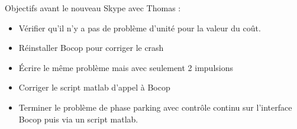 \documentclass[fleqn,%
a4paper,11pt]{scrbook}
\begin{document}
Objectifs avant le nouveau Skype avec Thomas :
	\begin{itemize}
		\item Vérifier qu'il n'y a pas de problème d'unité pour la valeur du coût.
		\item Réinstaller Bocop pour corriger le crash
		\item Écrire le même problème mais avec seulement 2 impulsions
		\item Corriger le script matlab d'appel à Bocop
		\item Terminer le problème de phase parking avec contrôle continu sur l'interface Bocop puis via un script matlab.
	\end{itemize}
\end{document}
